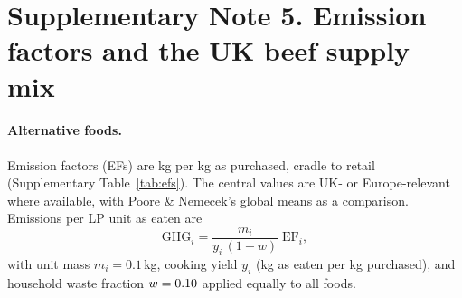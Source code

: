 \documentclass[10pt]{article}
\begin{document}
\begin{table}[H]
\centering\small
\caption{\textbf{Sensitivity of basket emissions (kg \COtwoe{} per 100\,g beef replaced) and mass (g) to bioavailability and energy assumptions.}
Infeasible baskets (shortfall in at least one nutrient) are marked with~$^\dagger$.}
\label{tab:basketsens}
\resizebox{\linewidth}{!}{}
\end{table}

\section{Supplementary Note 5. Emission factors and the UK beef supply mix}
\label{si:ef}

\paragraph{Alternative foods.} Emission factors (EFs) are kg \COtwoe{} per kg as
purchased, cradle to retail (Supplementary Table~\ref{tab:efs}). The central values are UK- or
Europe-relevant where available, with Poore \& Nemecek's global means\cite{poore2018}
as a comparison. Emissions per LP unit as eaten are
\begin{equation}
\mathrm{GHG}_i = \frac{m_i}{y_i\,(1-w)}\;\mathrm{EF}_i,
\end{equation}
with unit mass $m_i=0.1$\,kg, cooking yield $y_i$ (kg as eaten per kg purchased),
and household waste fraction $w=0.10$ applied equally to all foods.

\begin{table}[p]
\centering\scriptsize
\caption{\textbf{Emission factors (kg \COtwoe{} per kg as purchased).} Central value, 90\% interval used
in Monte Carlo sampling (log-normal), Poore \& Nemecek global mean, cooking yield and greenhouse-gas
composition used for metric conversions.}
\label{tab:efs}
\resizebox{\linewidth}{!}{}
\end{table}
\end{document}

